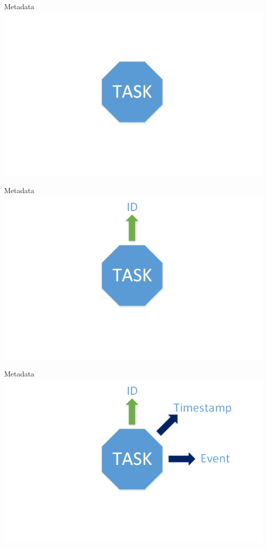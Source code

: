 	\begin{frame}{Metadata}
	\includegraphics[width=1.0\textwidth]{images/Task/metadata2.png}
	\end{frame}
	
	\begin{frame}{Metadata}
	\includegraphics[width=1.0\textwidth]{images/Task/metadata3.png}
	\end{frame}
	
	\begin{frame}{Metadata}
	\includegraphics[width=1.0\textwidth]{images/Task/metadata4.png}
	\end{frame}
	
